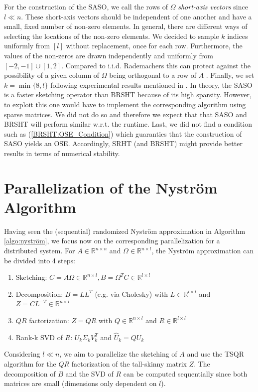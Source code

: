\documentclass{article}
\theoremstyle{definition}
\begin{document}
For the construction of the SASO, we call the rows of $\Omega$ \textit{short-axis vectors} since $l \ll n$. These short-axis vectors should be independent of one another and have a small, fixed number of non-zero elements. In general, there are different ways of selecting the locations of the non-zero elements. We decided to sample $k$ indices uniformly from $[l]$ without replacement, once for each row. Furthermore, the values of the non-zeros are drawn independently and uniformly from $[-2,-1] \cup [1, 2]$. Compared to i.i.d. Rademachers this can protect against the possibility of a given column of $\Omega$ being orthogonal to a row of $A$ \cite{murray2023}. Finally, we set $k = \min\{8, l\}$ following experimental results mentioned in \cite{murray2023}. In theory, the SASO is a faster sketching operator than BRSHT because of its high sparsity. However, to exploit this one would have to implement the corresponding algorithm using sparse matrices. We did not do so and therefore we expect that that SASO and BRSHT will perform similar w.r.t. the runtime. Last, we did not find a condition such as (\ref{BRSHT:OSE_Condition}) which guaranties that the construction of SASO yields an OSE. Accordingly, SRHT (and BRSHT) might provide better results in terms of numerical stability.

\section{Parallelization of the Nyström Algorithm}\label{sec:parallel_nystrom}
Having seen the (sequential) randomized Nyström approximation in Algorithm \ref{algo:nyström}, we focus now on the corresponding parallelization for a distributed system. For $A \in \mathbb{R}^{n \times n}$ and $\Omega \in \mathbb{R}^{n \times l}$, the Nyström approximation can be divided into 4 steps:
\begin{enumerate}
    \item Sketching: $C = A \Omega \in \mathbb{R}^{n \times l}, B = \Omega^T C \in \mathbb{R}^{l \times l}$
    \item Decomposition: $B = LL^T$ (e.g. via Cholesky) with $L \in \mathbb{R}^{l \times l}$ and $Z = C L^{-T} \in \mathbb{R}^{n \times l}$
    \item $QR$ factorization: $Z = QR$ with $Q \in \mathbb{R}^{n \times l}$ and $R \in \mathbb{R}^{l \times l}$
    \item Rank-k SVD of $R$: $U_k \Sigma_k V_k^T$ and $\hat{U}_k = Q U_k$
\end{enumerate}
Considering $l \ll n$, we aim to parallelize the sketching of $A$ and use the TSQR algorithm for the $QR$ factorization of the tall-skinny matrix $Z$. The decomposition of $B$ and the SVD of $R$ can be computed sequentially since both matrices are small (dimensions only dependent on $l$).
\end{document}
